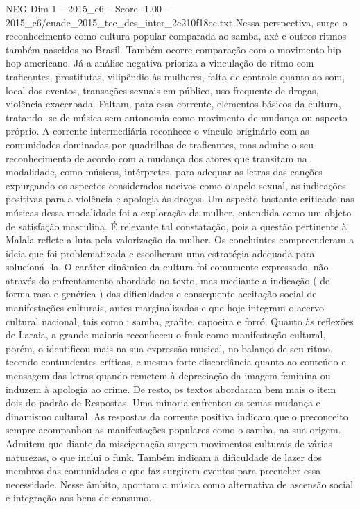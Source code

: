 \begin{textsample}{NEG Dim 1 – 2015\_c6 – Score -1.00 – 2015\_c6/enade\_2015\_tec\_des\_inter\_2e210f18ec.txt}
Nessa perspectiva, surge o reconhecimento como cultura popular comparada ao samba, axé e outros ritmos também nascidos no Brasil.
Também ocorre comparação com o movimento hip-hop americano.
Já a análise negativa prioriza a vinculação do ritmo com traficantes, prostitutas, vilipêndio às mulheres, falta de controle quanto ao som, local dos eventos, transações sexuais em público, uso frequente de drogas, violência exacerbada.
Faltam, para essa corrente, elementos básicos da cultura, tratando -se de música sem autonomia como movimento de mudança ou aspecto próprio.
A corrente intermediária reconhece o vínculo originário com as comunidades dominadas por quadrilhas de traficantes, mas admite o seu reconhecimento de acordo com a mudança dos atores que transitam na modalidade, como músicos, intérpretes, para adequar as letras das canções expurgando os aspectos considerados nocivos como o apelo sexual, as indicações positivas para a violência e apologia às drogas.
Um aspecto bastante criticado nas músicas dessa modalidade foi a exploração da mulher, entendida como um objeto de satisfação masculina.
É relevante tal constatação, pois a questão pertinente à Malala reflete a luta pela valorização da mulher.
Os concluintes compreenderam a ideia que foi problematizada e escolheram uma estratégia adequada para solucioná -la.
O caráter dinâmico da cultura foi comumente expressado, não através do enfrentamento abordado no texto, mas mediante a indicação ( de forma rasa e genérica ) das dificuldades e consequente aceitação social de manifestações culturais, antes marginalizadas e que hoje integram o acervo cultural nacional, tais como : samba, grafite, capoeira e forró.
Quanto às reflexões de Laraia, a grande maioria reconheceu o funk como manifestação cultural, porém, o identificou mais na sua expressão musical, no balanço de seu ritmo, tecendo contundentes críticas, e mesmo forte discordância quanto ao conteúdo e mensagem das letras quando remetem à depreciação da imagem feminina ou induzem à apologia ao crime.
De resto, os textos abordaram bem mais o item dois do padrão de Respostas.
Uma minoria enfrentou os temas mudança e dinamismo cultural.
As respostas da corrente positiva indicam que o preconceito sempre acompanhou as manifestações populares como o samba, na sua origem.
Admitem que diante da miscigenação surgem movimentos culturais de várias naturezas, o que inclui o funk.
Também indicam a dificuldade de lazer dos membros das comunidades o que faz surgirem eventos para preencher essa necessidade.
Nesse âmbito, apontam a música como alternativa de ascensão social e integração aos bens de consumo.

\end{textsample}
